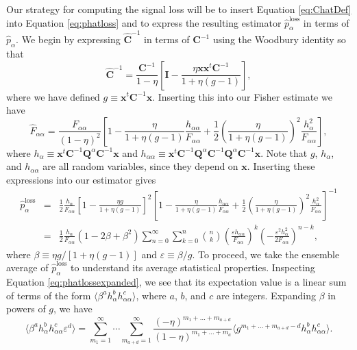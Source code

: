 \documentclass[preprint2,numberedappendix,tighten]{aastex6}  %
\newcommand{\x}{\mathbf{x}}
\newcommand{\C}{\mathbf{C}}
\newcommand{\Chat}{\mathbf{\hat{C}}}
\newcommand{\Q}{\mathbf{Q}}
\newcommand{\I}{\mathbf{I}}
\begin{document}
Our strategy for computing the signal loss will be to insert Equation \eqref{eq:ChatDef} into Equation \eqref{eq:phatloss} and to express the resulting estimator $\hat{p}_\alpha^\textrm{loss}$ in terms of $\hat{p}_\alpha$. We begin by expressing $\Chat^{-1}$ in terms of $\C^{-1}$ using the Woodbury identity so that
\begin{equation}
\Chat^{-1} = \frac{\C^{-1}}{1-\eta} \left[ \I - \frac{\eta \x \x^t \C^{-1}}{1+ \eta (g-1)}\right],
\end{equation}
where we have defined $g \equiv \x^t \C^{-1} \x$. Inserting this into our Fisher estimate we have
\begin{equation}
\hat{F}_{\alpha \alpha} = \frac{F_{\alpha \alpha}}{(1-\eta)^2} \left[ 1 -\frac{\eta }{1+ \eta (g-1)} \frac{h_{\alpha \alpha}}{F_{\alpha \alpha}} + \frac{1}{2} \left( \frac{\eta }{1+ \eta (g-1)} \right)^2 \frac{h_\alpha^2}{F_{\alpha \alpha}}\right],
\end{equation}
where $h_\alpha \equiv \x^t \C^{-1} \Q^\alpha \C^{-1} \x $ and $h_{\alpha \alpha} \equiv \x^t \C^{-1} \Q^\alpha \C^{-1} \Q^\alpha \C^{-1}\x $. Note that $g$, $h_\alpha$, and $h_{\alpha \alpha}$ are all random variables, since they depend on $\x$. Inserting these expressions into our estimator gives
\begin{eqnarray}
\label{eq:phatlossexpanded}
\hat{p}_\alpha^\textrm{loss} &=& \frac{1}{2} \frac{h_\alpha}{F_{\alpha \alpha}} \left[ 1 - \frac{\eta g}{1+ \eta (g-1)}\right]^2  \left[ 1 -\frac{\eta }{1+ \eta (g-1)} \frac{h_{\alpha \alpha}}{F_{\alpha \alpha}} + \frac{1}{2} \left( \frac{\eta }{1+ \eta (g-1)} \right)^2 \frac{h_\alpha^2}{F_{\alpha \alpha}}\right]^{-1} \nonumber \\
&=& \frac{1}{2} \frac{h_\alpha}{F_{\alpha \alpha}}\left(1-2\beta + \beta^2\right)\sum_{n=0}^\infty \sum_{k=0}^n {n \choose k} \left( \frac{\varepsilon h_{\alpha \alpha}}{F_{\alpha \alpha}}\right)^k \left( - \frac{\varepsilon^2 h_\alpha^2}{2 F_{\alpha \alpha}}\right)^{n-k},
\end{eqnarray}
where $\beta \equiv \eta g/[1+ \eta (g-1)]$ and $\varepsilon \equiv \beta / g$. To proceed, we take the ensemble average of $\hat{p}_\alpha^\textrm{loss}$ to understand its average statistical properties. Inspecting Equation \eqref{eq:phatlossexpanded}, we see that its expectation value is a linear sum of terms of the form $\langle \beta^a h_\alpha^b h_{\alpha \alpha}^c \rangle$, where $a$, $b$, and $c$ are integers. Expanding $\beta$ in powers of $g$, we have
\begin{equation}
\label{eq:betahh}
\langle \beta^a h_\alpha^b h_{\alpha \alpha}^c \varepsilon^d \rangle = \sum_{m_1 = 1}^\infty \cdots \sum_{m_{a+d} = 1}^\infty \frac{(-\eta)^{m_1 + \dots + m_{a+d}}}{(1-\eta)^{m_1 + \dots + m_a}} \langle g^{m_1 + \dots + m_{a+d}-d} h_\alpha^b h_{\alpha \alpha}^c \rangle.
\end{equation}
\end{document}
